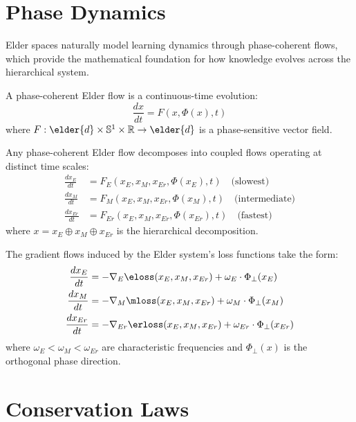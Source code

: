 \section{Phase Dynamics}

Elder spaces naturally model learning dynamics through phase-coherent flows, which provide the mathematical foundation for how knowledge evolves across the hierarchical system.

\begin{definition}
A phase-coherent Elder flow is a continuous-time evolution:
\begin{equation}
\frac{dx}{dt} = F(x, \Phi(x), t)
\end{equation}
where $F: \elder{d} \times \mathbb{S}^1 \times \mathbb{R} \rightarrow \elder{d}$ is a phase-sensitive vector field.
\end{definition}

\begin{theorem}
\label{thm:elder-flow-decomposition}
Any phase-coherent Elder flow decomposes into coupled flows operating at distinct time scales:
\begin{align}
\frac{dx_E}{dt} &= F_E(x_E, x_M, x_{Er}, \Phi(x_E), t) \quad \text{(slowest)}\\
\frac{dx_M}{dt} &= F_M(x_E, x_M, x_{Er}, \Phi(x_M), t) \quad \text{(intermediate)}\\
\frac{dx_{Er}}{dt} &= F_{Er}(x_E, x_M, x_{Er}, \Phi(x_{Er}), t) \quad \text{(fastest)}
\end{align}
where $x = x_E \oplus x_M \oplus x_{Er}$ is the hierarchical decomposition.
\end{theorem}

The gradient flows induced by the Elder system's loss functions take the form:
\begin{align}
\frac{dx_E}{dt} &= -\nabla_E \eloss(x_E, x_M, x_{Er}) + \omega_E \cdot \Phi_{\perp}(x_E)\\
\frac{dx_M}{dt} &= -\nabla_M \mloss(x_E, x_M, x_{Er}) + \omega_M \cdot \Phi_{\perp}(x_M)\\
\frac{dx_{Er}}{dt} &= -\nabla_{Er} \erloss(x_E, x_M, x_{Er}) + \omega_{Er} \cdot \Phi_{\perp}(x_{Er})
\end{align}
where $\omega_E < \omega_M < \omega_{Er}$ are characteristic frequencies and $\Phi_{\perp}(x)$ is the orthogonal phase direction.

\section{Conservation Laws}

